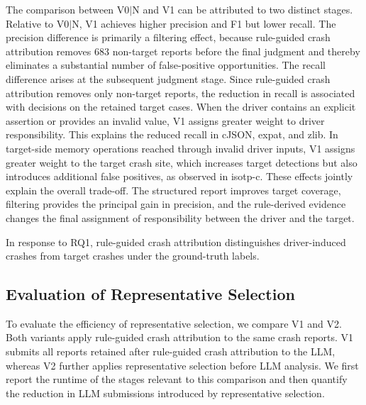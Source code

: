 \documentclass[pdflatex,sn-basic]{sn-jnl}%
\theoremstyle{thmstyleone}%
\theoremstyle{thmstyletwo}%
\theoremstyle{thmstylethree}%
\begin{document}
{\color{blue}
The comparison between V0$\mid$N and V1 can be attributed to two distinct stages. Relative to V0$\mid$N, V1 achieves higher precision and F1 but lower recall. The precision difference is primarily a filtering effect, because rule-guided crash attribution removes 683 non-target reports before the final judgment and thereby eliminates a substantial number of false-positive opportunities. The recall difference arises at the subsequent judgment stage. Since rule-guided crash attribution removes only non-target reports, the reduction in recall is associated with decisions on the retained target cases. When the driver contains an explicit assertion or provides an invalid value, V1 assigns greater weight to driver responsibility. This explains the reduced recall in cJSON, expat, and zlib. In target-side memory operations reached through invalid driver inputs, V1 assigns greater weight to the target crash site, which increases target detections but also introduces additional false positives, as observed in isotp-c. These effects jointly explain the overall trade-off. The structured report improves target coverage, filtering provides the principal gain in precision, and the rule-derived evidence changes the final assignment of responsibility between the driver and the target.
}

In response to RQ1, rule-guided crash attribution distinguishes driver-induced crashes from target crashes under the ground-truth labels.

\subsection{Evaluation of Representative Selection}
\label{subsec:representative-evaluation}

To evaluate the efficiency of representative selection, we compare V1 and V2. Both variants apply rule-guided crash attribution to the same crash reports. V1 submits all reports retained after rule-guided crash attribution to the LLM, whereas V2 further applies representative selection before LLM analysis. We first report the runtime of the stages relevant to this comparison and then quantify the reduction in LLM submissions introduced by representative selection.
\end{document}
